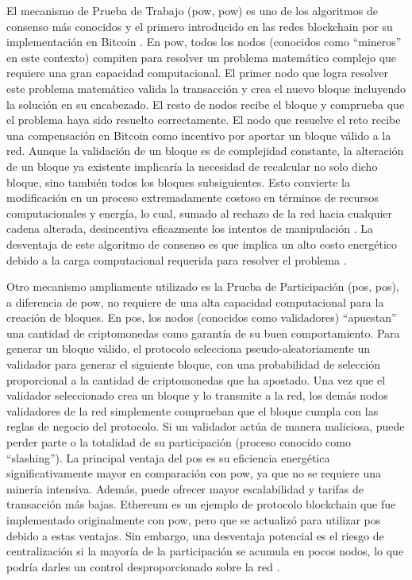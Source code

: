 El mecanismo de Prueba de Trabajo (\acrshort{pow}, \acrlong{pow}) es uno de los algoritmos de consenso más conocidos y el primero introducido en las redes blockchain por su implementación en Bitcoin \cite{satoshi2008bitcoin}. En \acrshort{pow}, todos los nodos (conocidos como ``mineros'' en este contexto) compiten para resolver un problema matemático complejo que requiere una gran capacidad computacional. El primer nodo que logra resolver este problema matemático valida la transacción y crea el nuevo bloque incluyendo la solución en su encabezado. El resto de nodos recibe el bloque y comprueba que el problema haya sido resuelto correctamente. El nodo que resuelve el reto recibe una compensación en Bitcoin como incentivo por aportar un bloque válido a la red. Aunque la validación de un bloque es de complejidad constante, la alteración de un bloque ya existente implicaría la necesidad de recalcular no solo dicho bloque, sino también todos los bloques subsiguientes. Esto convierte la modificación en un proceso extremadamente costoso en términos de recursos computacionales y energía, lo cual, sumado al rechazo de la red hacia cualquier cadena alterada, desincentiva eficazmente los intentos de manipulación \cite{satoshi2008bitcoin}. La desventaja de este algoritmo de consenso es que implica un alto costo energético debido a la carga computacional requerida para resolver el problema \cite{diez2023web}.

Otro mecanismo ampliamente utilizado es la Prueba de Participación (\acrshort{pos}, \acrlong{pos}), a diferencia de \acrshort{pow}, no requiere de una alta capacidad computacional para la creación de bloques. En \acrshort{pos}, los \glspl{nodo} (conocidos como validadores) ``apuestan'' una cantidad de \glspl{criptomoneda} como garantía de su buen comportamiento. Para generar un bloque válido, el protocolo selecciona pseudo-aleatoriamente un validador para generar el siguiente bloque, con una probabilidad de selección proporcional a la cantidad de criptomonedas que ha apostado. Una vez que el validador seleccionado crea un bloque y lo transmite a la red, los demás nodos validadores de la red simplemente comprueban que el bloque cumpla con las reglas de negocio del protocolo. Si un validador actúa de manera maliciosa, puede perder parte o la totalidad de su participación (proceso conocido como ``slashing''). La principal ventaja del \acrshort{pos} es su eficiencia energética significativamente mayor en comparación con \acrshort{pow}, ya que no se requiere una minería intensiva. Además, puede ofrecer mayor escalabilidad y tarifas de transacción más bajas. Ethereum es un ejemplo de protocolo blockchain que fue implementado originalmente con \acrshort{pow}, pero que se actualizó para utilizar \acrshort{pos} debido a estas ventajas. Sin embargo, una desventaja potencial es el riesgo de centralización si la mayoría de la participación se acumula en pocos nodos, lo que podría darles un control desproporcionado sobre la red \cite{tripathi2023comprehensive}.


